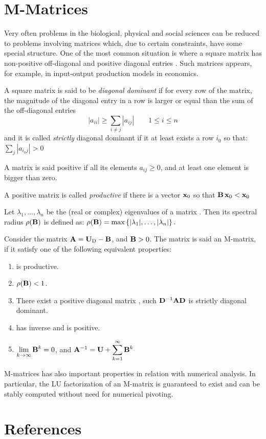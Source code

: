 \documentclass[preprint,12pt,times]{elsarticle}
\begin{document}
\appendix
\section{M-Matrices}
\label{A:1}
Very often problems in the biological, physical and social sciences can be reduced to problems involving matrices which, due to certain constraints, have some special structure. One of the most common situation is where a square matrix has non-positive off-diagonal and positive diagonal entries \cite{Smith:2012qr}. Such matrices appears, for example, in input-output production models in economics.

A square matrix  is said to be \emph{diagonal dominant} if for every row of the matrix, the magnitude of the diagonal entry in a row is larger or equal than the sum of the off-diagonal entries
\[ \left|a_{ii}\right| \geq \sum_{i \neq j} {\left|a_{ij}\right|}
\qquad 1 \leq i \leq n \]
and it is called \emph{strictly} diagonal dominant if it at least exists a row $i_0$
so that: $\sum_{j}{\left| a_{i_0 j} \right|} > 0$

A matrix  is said positive if all its elements $a_{ij}\ge0$, and at least one element is bigger than zero. 

A positive matrix  is called \emph{productive} \cite{Smith:2013jd} if there is a vector $\mathbf{x}_0$ so that
$\mathbf{B}\,\mathbf{x}_0 < \mathbf{x}_0$

Let $\lambda _{1},\ldots ,\lambda _{n}$ be the (real or complex) eigenvalues of a matrix . Then its spectral radius $\rho(\mathbf{B})$ is defined as:
\(\displaystyle \rho (\mathbf{B})=\max \left\{|\lambda _{1}|,\ldots ,|\lambda _{n}|\right\}.\)

Consider the matrix $\mathbf{A}=\mathbf{U}_\mathrm{D}-\mathbf{B}$, and $\mathbf{B}>0$. The matrix  is said an M-matrix, if it satisfy one of the following equivalent properties:
\begin{enumerate}
	\item {} is productive.
	\item $\rho(\mathbf{B})<1$.
	\item There exist a positive diagonal matrix , such $\mathbf{D}^{-1}\mathbf{A}\mathbf{D}$ is strictly diagonal dominant.
	\item {} has inverse and  is positive.
	\item $\displaystyle{\lim_{k\rightarrow\infty}\ensuremath{\mathbf{B}}^k=0}$, and 
	$\mathbf{A}^{-1}=\mathbf{U}+\displaystyle{\sum_{k=1}^{\infty}{\ensuremath{\mathbf{B}}^{k}}}$	
\end{enumerate}	
M-matrices has also important properties in relation with numerical analysis. In particular, the LU factorization of an M-matrix is guaranteed to exist and can be stably computed without need for numerical pivoting. \cite{Smith:2012qr}

\section*{References}


\end{document}
